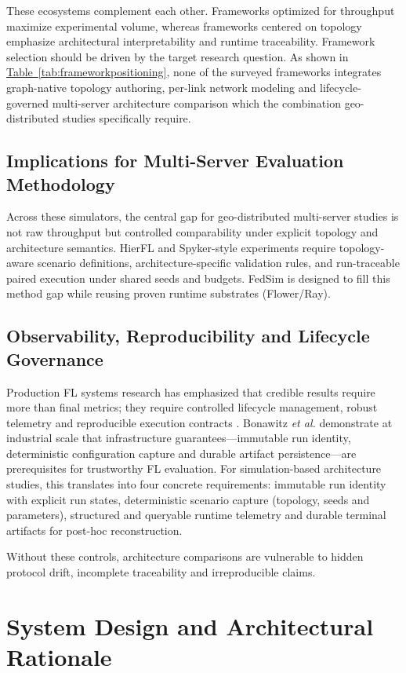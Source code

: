 \documentclass[conference]{IEEEtran}
\newcommand{\tabref}[1]{\hyperref[#1]{Table~\ref*{#1}}}
\begin{document}
These ecosystems complement each other. Frameworks optimized for throughput maximize experimental volume, whereas frameworks centered on topology emphasize architectural interpretability and runtime traceability. Framework selection should be driven by the target research question. As shown in \tabref{tab:frameworkpositioning}, none of the surveyed frameworks integrates graph-native topology authoring, per-link network modeling and lifecycle-governed multi-server architecture comparison which the combination geo-distributed studies specifically require.

\subsection{Implications for Multi-Server Evaluation Methodology}
Across these simulators, the central gap for geo-distributed multi-server studies is not raw throughput but controlled comparability under explicit topology and architecture semantics. HierFL and Spyker-style experiments require topology-aware scenario definitions, architecture-specific validation rules, and run-traceable paired execution under shared seeds and budgets. FedSim is designed to fill this method gap while reusing proven runtime substrates (Flower/Ray).

\subsection{Observability, Reproducibility and Lifecycle Governance}
Production FL systems research has emphasized that credible results require more than final metrics; they require controlled lifecycle management, robust telemetry and reproducible execution contracts \cite{bonawitz2019}. Bonawitz \textit{et al.} \cite{bonawitz2019} demonstrate at industrial scale that infrastructure guarantees—immutable run identity, deterministic configuration capture and durable artifact persistence—are prerequisites for trustworthy FL evaluation. For simulation-based architecture studies, this translates into four concrete requirements: immutable run identity with explicit run states, deterministic scenario capture (topology, seeds and parameters), structured and queryable runtime telemetry and durable terminal artifacts for post-hoc reconstruction.

Without these controls, architecture comparisons are vulnerable to hidden protocol drift, incomplete traceability and irreproducible claims.

\section{System Design and Architectural Rationale}
\label{sec:design}
\end{document}

